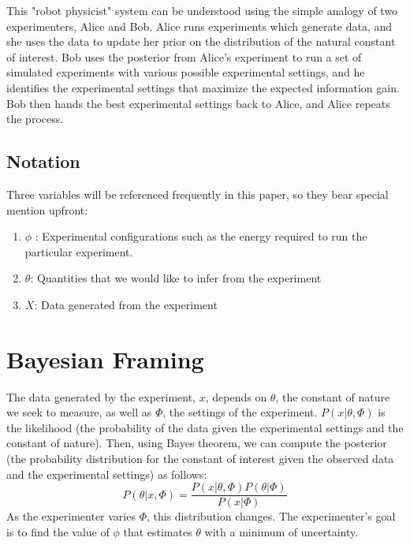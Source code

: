 \documentclass[10pt,journal,compsoc]{IEEEtran}
\begin{document}
This "robot physicist" system can be understood using the simple analogy of two experimenters, Alice and Bob. Alice runs experiments which generate data, and she uses the data to update her prior on the distribution of the natural constant of interest. Bob uses the posterior from Alice's experiment to run a set of simulated experiments with various possible experimental settings, and he identifies the experimental settings that maximize the expected information gain. Bob then hands the best experimental settings back to Alice, and Alice repeats the process.


\subsection{Notation}
Three variables will be referenced frequently in this paper, so they bear special mention upfront:
\begin{enumerate}
\item $\phi$ : Experimental configurations such as the energy required to run the particular experiment.
\item $\theta$: Quantities that we would like to infer from the experiment
\item $X$: Data generated from the experiment
\end{enumerate}

% 

\section{Bayesian Framing}
The data generated by the experiment, $x$, depends on $\theta$, the constant of nature we seek to measure, as well as $\Phi$, the settings of the experiment. $P(x|\theta,\Phi)$ is the likelihood (the probability of the data given the experimental settings and the constant of nature). Then, using Bayes theorem, we can compute the posterior (the probability distribution for the constant of interest given the observed data and the experimental settings) as follows:
\begin{equation}
P(\theta|x,\Phi)=\frac{P(x|\theta,\Phi)P(\theta|\Phi)}{P(x|\Phi)}
\end{equation}
As the experimenter varies $\Phi$, this distribution changes. The experimenter's goal is to find the value of $\phi$ that estimates $\theta$ with a minimum of uncertainty.
\end{document}
